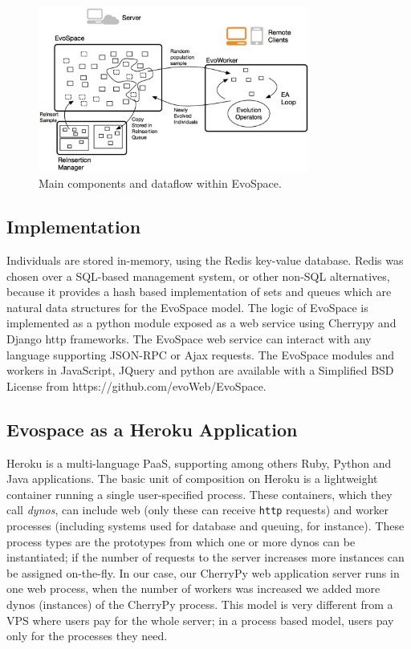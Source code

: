 \documentclass{llncs}
\begin{document}
\begin{figure}[!t]
    \centering
        \includegraphics[width=3.5in]{eps/evospaceExample.eps}
    \caption{Main components and dataflow within EvoSpace.}
    \label{fig:evo}
\end{figure}


\subsection{Implementation}
Individuals are stored in-memory, using the Redis key-value database.
Redis was chosen over a SQL-based management system, or other non-SQL 
alternatives, because it provides a hash based implementation of sets 
and queues which are natural data structures for the EvoSpace model. 
The logic of EvoSpace is implemented as a python module exposed as a web 
service using Cherrypy and Django http frameworks. The EvoSpace 
web service can interact with any language supporting JSON-RPC 
or Ajax requests. The EvoSpace modules and workers in JavaScript, 
JQuery and python are available with a Simplified BSD License from 
https://github.com/evoWeb/EvoSpace. 

\subsection{Evospace as a Heroku Application}
Heroku is a multi-language PaaS, supporting among others
Ruby, Python and Java applications. The basic unit of composition on
Heroku is a lightweight container running a single user-specified
process. These containers, which they call {\em dynos}, can include web
(only these can receive {\tt http} requests) and worker processes
(including systems used for database and queuing, for instance).
These  process types are the prototypes from which one or more dynos 
can be instantiated; if the number of requests to the server increases
more instances can be assigned on-the-fly. In our case, our CherryPy 
web application server runs in one web process, when the number 
of workers was increased we added more dynos (instances) of the 
CherryPy process.
This model is very different from a VPS where users pay for the
whole server; in a process based model, users pay only for the
processes they need.
\end{document}

